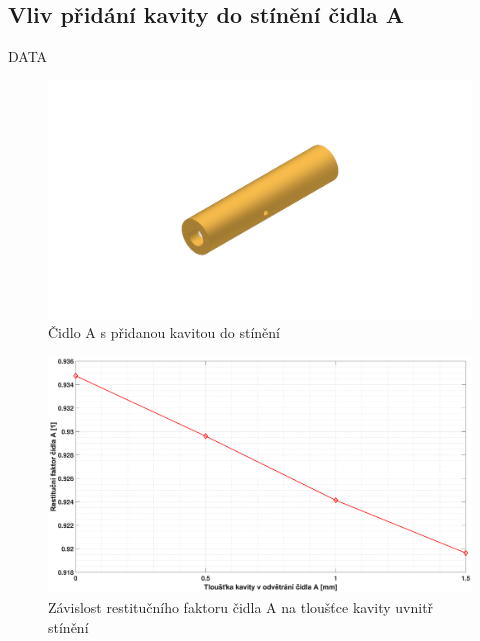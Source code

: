    \newpage
    \subsection{Vliv přidání kavity do stínění čidla A}
        DATA
        
        \begin{figure}[ht!]
            \centering
            \includegraphics[width=\textwidth]{400_SIMULACE_KONSTRUKCNICH_UPRAV/Vykresy_rendery/Kavita.png}
            \caption{Čidlo A s přidanou kavitou do stínění}
            \label{fig:kavita-A}
        \end{figure}
    
        \begin{figure}[ht!]
            \centering
            \includegraphics*[width=\textwidth, trim={5.25cm 1.0cm 5.8cm 2.0cm}]{400_SIMULACE_KONSTRUKCNICH_UPRAV/Grafy/kavita.eps}
            \caption{Závislost restitučního faktoru čidla A na tloušťce kavity uvnitř stínění}
            \label{fig:kavita-A-graf}
        \end{figure}
    
    \newpage
    
